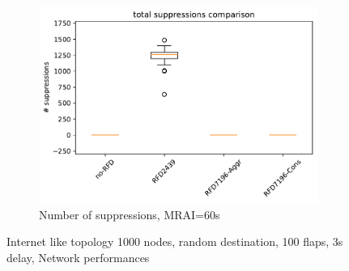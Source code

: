 \begin{figure}[H]
     \hfill
     \begin{subfigure}[b]{0.325\textwidth}
         \centering
         \includegraphics[width=\textwidth]{images/RFD/miceVSelephants/MultiMRAI/60/elephants/cisco_1000MRAI60_rfd_comparison_suppressions_boxplot.pdf}
         \caption{\scriptsize Number of suppressions, MRAI=60s}
         \label{fig:1000_RFD_MRAI60_suppressions_elephant}
     \end{subfigure}
        \caption{\scriptsize Internet like topology 1000 nodes, random destination, 100 flaps, 3s delay, Network performances}
        \label{fig:1000_RFD_MRAI30_elephant}
\end{figure}

